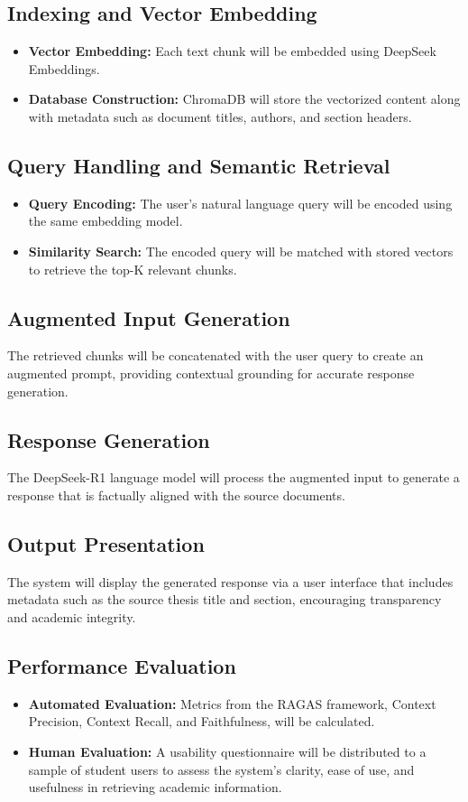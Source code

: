 \begin{refsection}
\subsection*{Indexing and Vector Embedding}
\begin{itemize}
    \item \textbf{Vector Embedding:} Each text chunk will be embedded using DeepSeek Embeddings.
    \item \textbf{Database Construction:} ChromaDB will store the vectorized content along with metadata such as document titles, authors, and section headers.
\end{itemize}

\subsection*{Query Handling and Semantic Retrieval}
\begin{itemize}
    \item \textbf{Query Encoding:} The user’s natural language query will be encoded using the same embedding model.
    \item \textbf{Similarity Search:} The encoded query will be matched with stored vectors to retrieve the top-K relevant chunks.
\end{itemize}

\subsection*{Augmented Input Generation}
The retrieved chunks will be concatenated with the user query to create an augmented prompt, providing contextual grounding for accurate response generation.

\subsection*{Response Generation}
The DeepSeek-R1 language model will process the augmented input to generate a response that is factually aligned with the source documents.

\subsection*{Output Presentation}
The system will display the generated response via a user interface that includes metadata such as the source thesis title and section, encouraging transparency and academic integrity.

\subsection*{Performance Evaluation}
\begin{itemize}
    \item \textbf{Automated Evaluation:} Metrics from the RAGAS framework, Context Precision, Context Recall, and Faithfulness, will be calculated.
    \item \textbf{Human Evaluation:} A usability questionnaire will be distributed to a sample of student users to assess the system’s clarity, ease of use, and usefulness in retrieving academic information.
\end{itemize}


\end{refsection}
